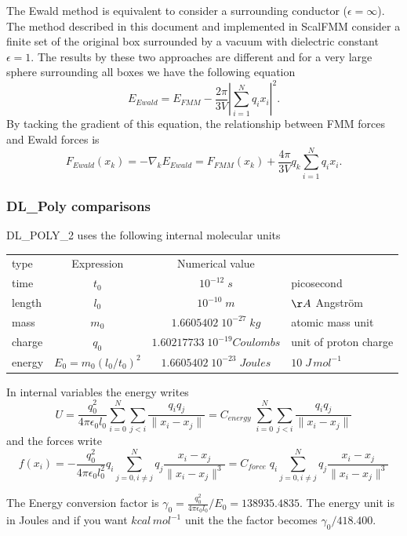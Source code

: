 \documentclass[12pt]{article} %
\begin{document}
The Ewald method is equivalent to consider a surrounding conductor ($\epsilon=\infty$). The method described in this document and implemented in ScalFMM consider a finite set of the original box surrounded by a vacuum with dielectric constant $\epsilon=1$. The results by these two approaches are different \cite{DeLeeuw1980, Heyes1981} and for a very large sphere surrounding all boxes we have the following equation
\begin{equation}
E_{Ewald} = E_{FMM} -\frac{2\pi}{3V}|\sum_{i=1}^{N}{q_i x_i}|^2.
\end{equation}
By tacking the gradient of this equation, the relationship between FMM forces and Ewald forces is
\begin{equation}
F_{Ewald}(x_k) = -\nabla_k E_{Ewald} = F_{FMM}(x_k)  + \frac{4\pi}{3V} q_k \sum_{i=1}^{N}{q_i x_i}.
\end{equation}
\subsubsection{DL\_Poly comparisons}
DL\_POLY\_2 uses the following internal molecular units \\

\begin{tabular}{|l|c|c|l|}
\hline
type & Expression & Numerical value & \\
time &$t_0$ & $10^{-12}\;s$& picosecond\\
length & $l_0$ &$10^{-10}\; m $& $\AA$ Angström\\
mass &  $m_0$ & $ 1.6605402 \; 10^{−27}\; kg $& atomic mass unit\\
charge &  $q_0$ & $1.60217733 \; 10^{−19} Coulombs$& unit of proton charge\\
energy & $E_0 = m_0(l_0/t_0)^2$&$1.6605402 \;  10^{−23}\; Joules $ & $10\; J\, mol^{-1}$\\
\hline
\end{tabular}

 In internal variables the energy writes 
$$
U = \frac{q_0^2}{4 \pi\epsilon_0 l_0}\sum_{i=0}^{N}{\sum_{j<i}{\frac{q_i q_j}{\|x_i-x_j\|}}}  = C_{energy}  \;\sum_{i=0}^{N}{\sum_{j<i}{\frac{q_i q_j}{\|x_i-x_j\|}}}
$$
and the forces write 
$$
f(x_i) = -\frac{q_0^2}{4 \pi\epsilon_0 l_0^2} q_i \sum_{j=0,i\neq j}^{N}{q_j\frac{x_i-x_j}{\|x_i-x_j\|^3}}
 = C_{force} \; q_i  \sum_{j=0,i\neq j}^{N}{q_j\frac{x_i-x_j}{\|x_i-x_j\|^3}}
$$

The Energy conversion factor is $\gamma_0 = \frac{q_0^2}{4 \pi\epsilon_0 l_0}/E_0 = 138935.4835$. The energy unit is in Joules and if you want $kcal\, mol^{-1}$ unit the the factor becomes $\gamma_0/418.400$.
\end{document}

